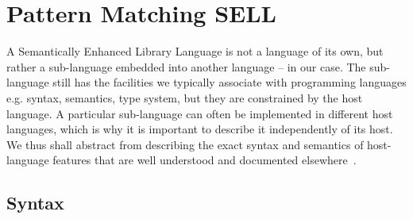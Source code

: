 \section{Pattern Matching SELL} %
\label{sec:pm}

A Semantically Enhanced Library Language is not a language of its own, but 
rather a sub-language embedded into another language -- \Cpp{} in our case. The 
sub-language still has the facilities we typically associate with programming 
languages e.g. syntax, semantics, type system, but they are constrained by
the host language. A particular sub-language can often be implemented in 
different host languages, which is why it is important to describe it 
independently of its host. We thus shall abstract from describing the 
exact syntax and semantics of host-language features that are well understood and documented 
elsewhere~\cite{C++11}.

\subsection{Syntax}
\label{sec:syn}

